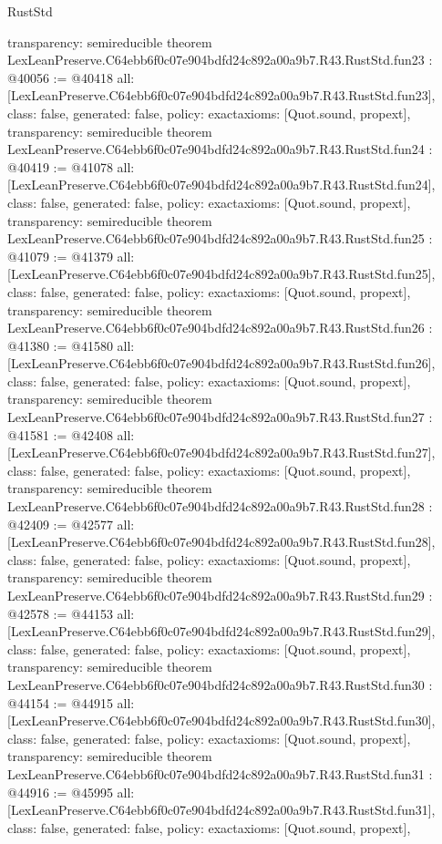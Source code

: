 \begin{lexlean}{RustStd}
\begin{coremodule}
{  transparency: semireducible
}
theorem LexLeanPreserve.C64ebb6f0c07e904bdfd24c892a00a9b7.R43.RustStd.fun23 : @40056 := @40418 {
  all: [LexLeanPreserve.C64ebb6f0c07e904bdfd24c892a00a9b7.R43.RustStd.fun23],
  class: false,
  generated: false,
  policy: exact{axioms: [Quot.sound, propext]},
  transparency: semireducible
}
theorem LexLeanPreserve.C64ebb6f0c07e904bdfd24c892a00a9b7.R43.RustStd.fun24 : @40419 := @41078 {
  all: [LexLeanPreserve.C64ebb6f0c07e904bdfd24c892a00a9b7.R43.RustStd.fun24],
  class: false,
  generated: false,
  policy: exact{axioms: [Quot.sound, propext]},
  transparency: semireducible
}
theorem LexLeanPreserve.C64ebb6f0c07e904bdfd24c892a00a9b7.R43.RustStd.fun25 : @41079 := @41379 {
  all: [LexLeanPreserve.C64ebb6f0c07e904bdfd24c892a00a9b7.R43.RustStd.fun25],
  class: false,
  generated: false,
  policy: exact{axioms: [Quot.sound, propext]},
  transparency: semireducible
}
theorem LexLeanPreserve.C64ebb6f0c07e904bdfd24c892a00a9b7.R43.RustStd.fun26 : @41380 := @41580 {
  all: [LexLeanPreserve.C64ebb6f0c07e904bdfd24c892a00a9b7.R43.RustStd.fun26],
  class: false,
  generated: false,
  policy: exact{axioms: [Quot.sound, propext]},
  transparency: semireducible
}
theorem LexLeanPreserve.C64ebb6f0c07e904bdfd24c892a00a9b7.R43.RustStd.fun27 : @41581 := @42408 {
  all: [LexLeanPreserve.C64ebb6f0c07e904bdfd24c892a00a9b7.R43.RustStd.fun27],
  class: false,
  generated: false,
  policy: exact{axioms: [Quot.sound, propext]},
  transparency: semireducible
}
theorem LexLeanPreserve.C64ebb6f0c07e904bdfd24c892a00a9b7.R43.RustStd.fun28 : @42409 := @42577 {
  all: [LexLeanPreserve.C64ebb6f0c07e904bdfd24c892a00a9b7.R43.RustStd.fun28],
  class: false,
  generated: false,
  policy: exact{axioms: [Quot.sound, propext]},
  transparency: semireducible
}
theorem LexLeanPreserve.C64ebb6f0c07e904bdfd24c892a00a9b7.R43.RustStd.fun29 : @42578 := @44153 {
  all: [LexLeanPreserve.C64ebb6f0c07e904bdfd24c892a00a9b7.R43.RustStd.fun29],
  class: false,
  generated: false,
  policy: exact{axioms: [Quot.sound, propext]},
  transparency: semireducible
}
theorem LexLeanPreserve.C64ebb6f0c07e904bdfd24c892a00a9b7.R43.RustStd.fun30 : @44154 := @44915 {
  all: [LexLeanPreserve.C64ebb6f0c07e904bdfd24c892a00a9b7.R43.RustStd.fun30],
  class: false,
  generated: false,
  policy: exact{axioms: [Quot.sound, propext]},
  transparency: semireducible
}
theorem LexLeanPreserve.C64ebb6f0c07e904bdfd24c892a00a9b7.R43.RustStd.fun31 : @44916 := @45995 {
  all: [LexLeanPreserve.C64ebb6f0c07e904bdfd24c892a00a9b7.R43.RustStd.fun31],
  class: false,
  generated: false,
  policy: exact{axioms: [Quot.sound, propext]},
}
\end{coremodule}
\end{lexlean}
